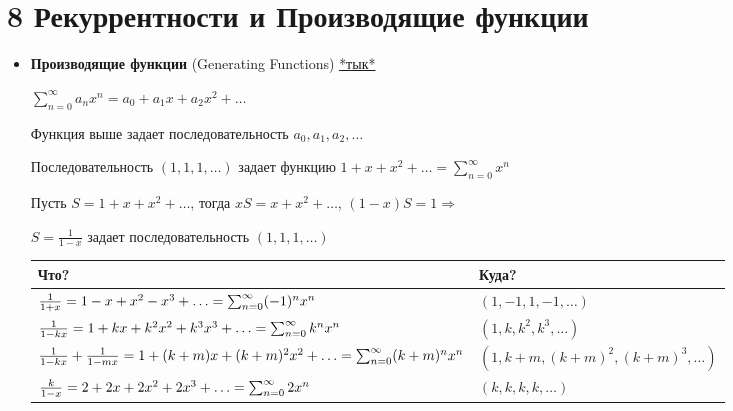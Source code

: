 \documentclass[12pt]{article}
\begin{document}
    \section{8 \quad Рекуррентности и Производящие функции}

    \begin{itemize}
        \item \textbf{Производящие функции} (Generating Functions)
        \hfill\href{https://ru.wikipedia.org/wiki/%D0%9F%D1%80%D0%BE%D0%B8%D0%B7%D0%B2%D0%BE%D0%B4%D1%8F%D1%89%D0%B0%D1%8F_%D1%84%D1%83%D0%BD%D0%BA%D1%86%D0%B8%D1%8F_%D0%BF%D0%BE%D1%81%D0%BB%D0%B5%D0%B4%D0%BE%D0%B2%D0%B0%D1%82%D0%B5%D0%BB%D1%8C%D0%BD%D0%BE%D1%81%D1%82%D0%B8}{*тык*}


        $\sum_{n = 0}^\infty a_n x^n = a_0 + a_1 x + a_2 x^2 + \dots$

        Функция выше задает последовательность $a_0, a_1, a_2, \dots$

        \Exs Последовательность $(1, 1, 1, \dots)$ задает функцию $1 + x + x^2 + \dots = \sum_{n = 0}^\infty x^n$

        Пусть $S = 1 + x + x^2 + \dots$, тогда $xS = x + x^2 + \dots$, $(1 - x) S = 1 \Longrightarrow $

        $S = \frac{1}{1 - x}$ задает последовательность $(1, 1, 1, \dots)$

        {
        \footnotesize
        \begin{tabular}{|p{}|p{}|}
            \hline

            \hfil Что? & \hfil Куда? \\

            \hline
            $\frac{1}{1 + x} = 1 - x + x^2 - x^3 + \dots \hfill = \sum_{n = 0}^\infty (-1)^n x^n$ & $(1, -1, 1, -1, \dots)$ \\

            $\frac{1}{1 - kx} = 1 + kx + k^2 x^2 + k^3 x^3 + \dots \hfill = \sum_{n = 0}^\infty k^n x^n$ & $(1, k, k^2, k^3, \dots)$ \\

            $\frac{1}{1 - kx} + \frac{1}{1 - mx} = 1 + (k + m)x + (k + m)^2 x^2 + \dots \hfill = \sum_{n = 0}^\infty (k + m)^n x^n$ & $(1, k + m, (k + m)^2, (k + m)^3, \dots)$ \\

            $\frac{k}{1 - x} = 2 + 2x + 2x^2 + 2x^3 + \dots \hfill = \sum_{n = 0}^\infty 2 x^n$ & $(k, k, k, k, \dots)$ \\


\end{tabular}}
\end{itemize}
\end{document}
